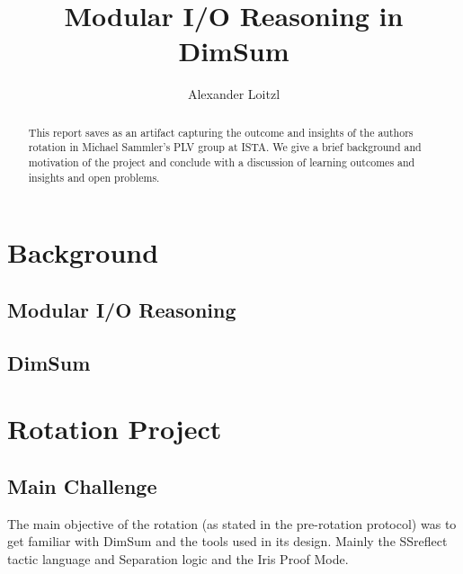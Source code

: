 \documentclass[runningheads, orivec]{llncs}
\begin{document}
\title{Modular I/O Reasoning in DimSum}
%
%
\author{Alexander Loitzl\Envelope{}}%
%

%
\maketitle              %
%
%

\begin{abstract}
  This report saves as an artifact capturing the outcome and insights of the authors rotation in Michael Sammler's PLV group at ISTA. We give a brief background and motivation of the project and conclude with a discussion of learning outcomes and insights and open problems.
\end{abstract}

\section{Background}
\subsection{Modular I/O Reasoning}
\subsection{DimSum}
\section{Rotation Project}

\subsection{Main Challenge}
The main objective of the rotation (as stated in the pre-rotation protocol) was to get familiar with DimSum and the tools used in its design. Mainly the SSreflect tactic language and Separation logic and the Iris Proof Mode.
\end{document}
